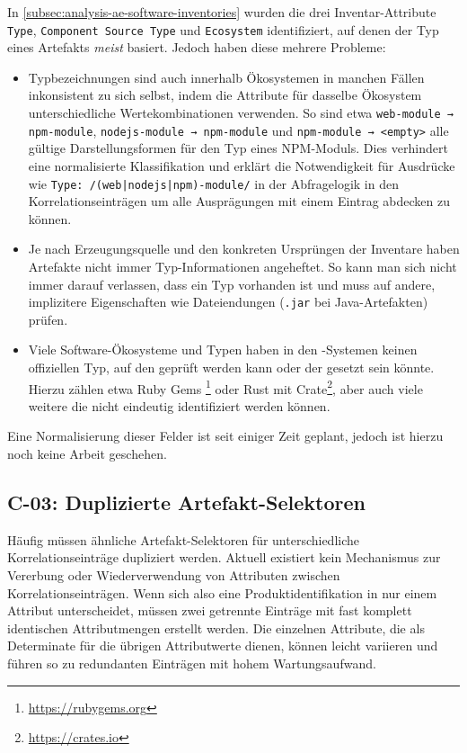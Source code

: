 In \autoref{subsec:analysis-ae-software-inventories} wurden die drei Inventar-Attribute \texttt{Type}, \texttt{Component Source Type} und \texttt{Ecosystem} identifiziert, auf denen der Typ eines Artefakts \textit{meist} basiert.
Jedoch haben diese mehrere Probleme:

\begin{itemize}
    \item Typbezeichnungen sind auch innerhalb Ökosystemen in manchen Fällen inkonsistent zu sich selbst, indem die Attribute für dasselbe Ökosystem unterschiedliche Wertekombinationen verwenden.
    So sind etwa \texttt{web-module → npm-module}, \texttt{nodejs-module → npm-module} und \texttt{npm-module → <empty>} alle gültige Darstellungsformen für den Typ eines NPM-Moduls.
    Dies verhindert eine normalisierte Klassifikation und erklärt die Notwendigkeit für Ausdrücke wie \texttt{Type: /(web|nodejs|npm)-module/} in der Abfragelogik in den Korrelationseinträgen um alle Ausprägungen mit einem Eintrag abdecken zu können.

    \item Je nach Erzeugungsquelle und den konkreten Ursprüngen der Inventare haben Artefakte nicht immer Typ-Informationen angeheftet.
    So kann man sich nicht immer darauf verlassen, dass ein Typ vorhanden ist und muss auf andere, implizitere Eigenschaften wie Dateiendungen (\texttt{.jar} bei Java-Artefakten) prüfen.

    \item Viele Software-Ökosysteme und Typen haben in den \metaeffekt-Systemen keinen offiziellen Typ, auf den geprüft werden kann oder der gesetzt sein könnte.
    Hierzu zählen etwa Ruby Gems \footnote{\url{https://rubygems.org}} oder Rust mit Crate\footnote{\url{https://crates.io}}, aber auch viele weitere die nicht eindeutig identifiziert werden können.
\end{itemize}

Eine Normalisierung dieser Felder ist seit einiger Zeit geplant, jedoch ist hierzu noch keine Arbeit geschehen.

\subsection{C-03: Duplizierte Artefakt-Selektoren}\label{subsec:c-03-duplizierte-artefakt-selektoren}


Häufig müssen ähnliche Artefakt-Selektoren für unterschiedliche Korrelationseinträge dupliziert werden.
Aktuell existiert kein Mechanismus zur Vererbung oder Wiederverwendung von Attributen zwischen Korrelationseinträgen.
Wenn sich also eine Produktidentifikation in nur einem Attribut unterscheidet, müssen zwei getrennte Einträge mit fast komplett identischen Attributmengen erstellt werden.
Die einzelnen Attribute, die als Determinate für die übrigen Attributwerte dienen, können leicht variieren und führen so zu redundanten Einträgen mit hohem Wartungsaufwand.

